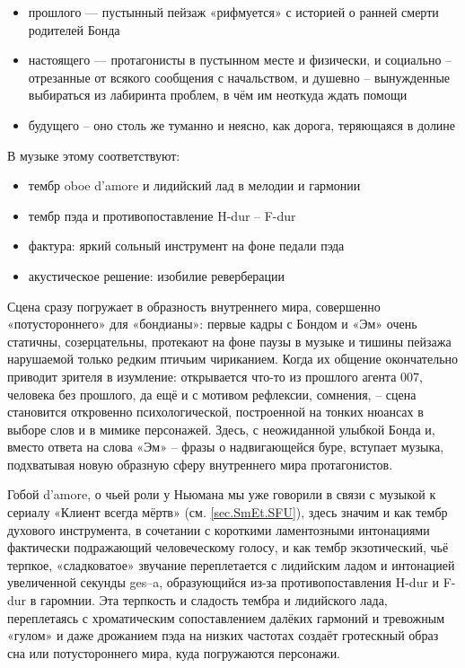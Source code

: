 \begin{itemize}
\tightlist
\item
  прошлого --- пустынный пейзаж «рифмуется» с историей о ранней смерти родителей Бонда
\item
  настоящего --- протагонисты в пустынном месте и физически, и социально -- отрезанные от всякого сообщения с начальством, и душевно -- вынужденные выбираться из лабиринта проблем, в чём им неоткуда ждать помощи
\item
  будущего -- оно столь же туманно и неясно, как дорога, теряющаяся в долине
\end{itemize}

В музыке этому соответствуют:

\begin{itemize}
\tightlist
\item
  тембр oboe d'amore и лидийский лад в мелодии и гармонии
\item
  тембр пэда и противопоставление H-dur -- F-dur
\item
  фактура: яркий сольный инструмент на фоне педали пэда
\item
  акустическое решение: изобилие реверберации
\end{itemize}

Сцена сразу погружает в образность внутреннего мира, совершенно «потустороннего» для «бондианы»: первые кадры с Бондом и «Эм» очень статичны, созерцательны, протекают на фоне паузы в музыке и тишины пейзажа нарушаемой только редким птичьим чириканием.
Когда их общение окончательно приводит зрителя в изумление: открывается что-то из прошлого агента 007, человека без прошлого, да ещё и с мотивом рефлексии, сомнения, -- сцена становится откровенно психологической, построенной на тонких нюансах в выборе слов и в мимике персонажей.
Здесь, с неожиданной улыбкой Бонда и, вместо ответа на слова «Эм» -- фразы о надвигающейся буре, вступает музыка, подхватывая новую образную сферу внутреннего мира протагонистов.

Гобой d'amore, о чьей роли у Ньюмана мы уже говорили в связи с музыкой к сериалу «Клиент всегда мёртв» (см. \ref{sec.SmEt.SFU}), здесь значим и как тембр духового инструмента, в сочетании с короткими ламентозными интонациями фактически подражающий человеческому голосу, и как тембр экзотический, чьё терпкое, «сладковатое» звучание переплетается с лидийским ладом и интонацией увеличенной секунды ges--a, образующийся из-за противопоставления H-dur и F-dur в гаромнии.
Эта терпкость и сладость тембра и лидийского лада, переплетаясь с хроматическим сопоставлением далёких гармоний и тревожным «гулом» и даже дрожанием пэда на низких частотах создаёт гротескный образ сна или потустороннего мира, куда погружаются персонажи.

